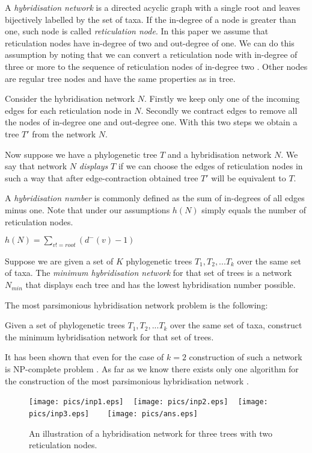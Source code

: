 \documentclass[runningheads, envcountsame, a4paper]{llncs}
\begin{document}
A \emph{hybridisation network} is a directed acyclic graph 
with a single root and leaves bijectively labelled by the set of taxa. If the in-degree of a node is greater than one, 
such node is called \emph{reticulation node}. In this paper we assume that reticulation nodes have in-degree of two and 
out-degree of one. We can do this assumption by noting that we can convert a reticulation node with in-degree 
of three or more to the sequence of reticulation nodes of in-degree two \cite{wu2010close}. Other nodes are regular 
tree nodes and have the same properties as in tree.

Consider the hybridisation network $N$. Firstly we keep only one of the incoming edges for each reticulation node in $N$. 
Secondly we contract edges to remove all the nodes of in-degree one and out-degree one. With this two steps we obtain a 
tree $T'$ from the network $N$.

Now suppose we have a phylogenetic tree $T$ and a hybridisation network $N$. We say that network $N$ \emph{displays} $T$ 
if we can choose the edges of reticulation nodes in such a way that after edge-contraction obtained tree $T'$ will be 
equivalent to $T$.

A \emph{hybridisation number} is commonly defined as the sum of in-degrees of all edges minus one. Note that under our 
assumptions $h(N)$ simply equals the number of reticulation nodes.

$h(N) = \sum\limits_{v != root} (d^-(v) - 1)$

Suppose we are given a set of $K$ phylogenetic trees $T_1, T_2, ... T_k$ over the same set of taxa. The \emph{minimum 
hybridisation network} for that set of trees is a network $N_{min}$ that displays each tree and has the lowest 
hybridisation number possible.

The most parsimonious hybridisation network problem is the following:

Given a set of phylogenetic trees $T_1, T_2, ... T_k$ over the same set of taxa, construct the minimum hybridisation 
network for that set of trees.

It has been shown that even for the case of $k=2$ construction of such a network is NP-complete problem 
\cite {bordewich2007computing}. As far as we know there exists only one algorithm for the construction of the most 
parsimonious hybridisation network \cite {wu2013algorithm}.

\begin{figure}[t]
  \centering
  \texttt{[image: pics/inp1.eps]}
  ~
  \texttt{[image: pics/inp2.eps]}
  ~
  \texttt{[image: pics/inp3.eps]}
  ~~~
  \texttt{[image: pics/ans.eps]}
  \caption{An illustration of a hybridisation network for three trees with two reticulation nodes.}
  \label{dfa-example}
\end{figure}
\end{document}

